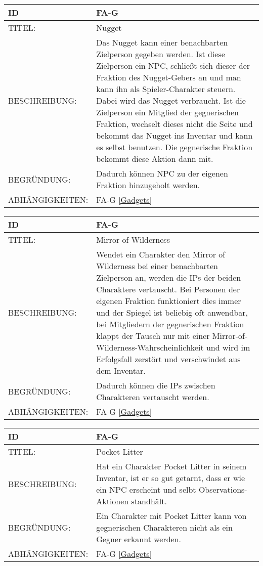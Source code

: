 \begin{tabularx}{16cm}{l|X}
	{table}\label{Nugget}
	\textbf{ID} & \textbf{FA-G \arabic{table}} \\
	\hline
	TITEL: & Nugget \\
	\hline
	BESCHREIBUNG: & Das Nugget kann einer benachbarten Zielperson gegeben werden. Ist diese Zielperson ein NPC, schließt sich dieser der Fraktion des Nugget-Gebers an und man kann ihn als Spieler-Charakter steuern. Dabei wird das Nugget verbraucht. Ist die Zielperson ein Mitglied der gegnerischen Fraktion, wechselt dieses nicht die Seite und bekommt das Nugget ins Inventar und kann es selbst benutzen. Die gegnerische Fraktion bekommt diese Aktion dann mit. \\
	\hline
	BEGRÜNDUNG: &  Dadurch können NPC zu der eigenen Fraktion hinzugeholt werden. \\
	\hline
	ABHÄNGIGKEITEN: & FA-G \ref{Gadgets} \\
\end{tabularx}

\begin{tabularx}{16cm}{l|X}
	{table}\label{Mirror of Wilderness}
	\textbf{ID} & \textbf{FA-G \arabic{table}} \\
	\hline
	TITEL: & Mirror of Wilderness \\
	\hline
	BESCHREIBUNG: & Wendet ein Charakter den Mirror of Wilderness bei einer benachbarten Zielperson an, werden die IPs der beiden Charaktere vertauscht. Bei Personen der eigenen Fraktion funktioniert dies immer und der Spiegel ist beliebig oft anwendbar, bei Mitgliedern der gegnerischen Fraktion klappt der Tausch nur mit einer Mirror-of-Wilderness-Wahrscheinlichkeit und wird im Erfolgsfall zerstört und verschwindet aus dem Inventar.\\
	\hline
	BEGRÜNDUNG: &  Dadurch können die IPs zwischen Charakteren vertauscht werden. \\
	\hline
	ABHÄNGIGKEITEN: & FA-G \ref{Gadgets} \\
\end{tabularx}

\begin{tabularx}{16cm}{l|X}
	{table}\label{Pocket Litter}
	\textbf{ID} & \textbf{FA-G \arabic{table}} \\
	\hline
	TITEL: & Pocket Litter \\
	\hline
	BESCHREIBUNG: & Hat ein Charakter Pocket Litter in seinem Inventar, ist er so gut getarnt, dass er wie ein NPC erscheint und selbt Observations-Aktionen standhält. \\
	\hline
	BEGRÜNDUNG: &  Ein Charakter mit Pocket Litter kann von gegnerischen Charakteren nicht als ein Gegner erkannt werden.  \\
	\hline
	ABHÄNGIGKEITEN: & FA-G \ref{Gadgets} \\
\end{tabularx}

